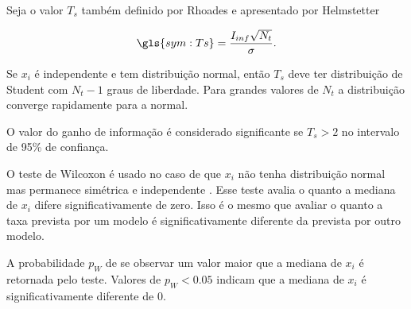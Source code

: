 Seja o valor $T_s$ também definido por Rhoades e apresentado por Helmstetter

\begin{equation}
	\ensuremath{
		\gls{sym:Ts} = \frac{I_{inf}\sqrt{N_t}}{\sigma}.
	}
	\label{eq:T}
\end{equation}

Se $x_i$ é independente e tem distribuição normal,
então $T_s$ deve ter distribuição de Student com $N_t - 1$ graus de liberdade. Para grandes valores de $N_t$
a distribuição converge rapidamente para a normal.

O valor do ganho de informação é considerado significante se $T_s > 2$ no intervalo de 95\% de confiança.

O teste de Wilcoxon é usado no caso de que $x_i$ não tenha distribuição normal
mas permanece simétrica e independente \citep{rhoades_2011}.
Esse teste avalia o quanto a mediana de $x_i$ difere significativamente de zero.
Isso é o mesmo que avaliar o quanto a taxa prevista por um modelo é significativamente diferente da prevista por 
outro modelo.

A probabilidade $p_W$ de se observar um valor maior que a mediana de $x_i$ é retornada pelo teste.
Valores de $p_W < 0.05$ indicam que a mediana de $x_i$ é significativamente diferente de 0.


